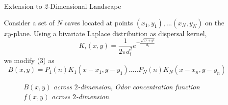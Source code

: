 \documentclass[final]{beamer}
\newlength{\sepwidth}
\newlength{\colwidth}
\newcommand{\separatorcolumn}{\begin{column}{\sepwidth}\end{column}}
\begin{document}
\begin{frame}[t]
\begin{columns}[t]
\begin{column}{\colwidth}
  
\end{column}

\separatorcolumn

\begin{column}{\colwidth}


  \begin{block}{Extension to \textit{2}-Dimensional Landscape}
  \begin{alertblock}{
 Consider a set of $N$ caves located at points $(x_1, y_1),
 ... (x_N, y_N) $ on the $xy$-plane. Using a bivariate Laplace distribution as dispersal kernel,
 $$K_i(x,y) =
\frac{1}{2\pi d_i^2} e^{ -\frac{\sqrt{x^2 + y^2}}{d_i}}
 $$
 we modify ($3$) as
$$
     B(x,y) = P_1(n)K_1(x-x_1,y-y_1) .....P_N(n)K_N(x-x_n,y-y_n)
     $$
 
}
  \end{alertblock}

\begin{figure}
   \hfill
{}
\hfill
{}
\hfill
\caption{\textit{ $B(x, y)$ across $2$-dimension},     \textit{Odor concentration function $f(x, y)$ across $2$-dimension}}
 \end{figure}
 

\end{block}
\end{column}
\end{columns}
\end{frame}
\end{document}
